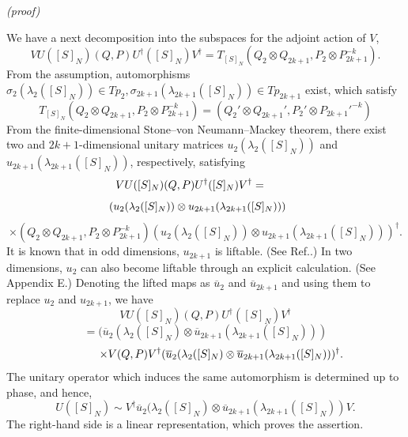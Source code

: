 \documentclass[12pt]{iopart}
\begin{document}
\noindent
{\it (proof)}

We have a next decomposition into the subspaces for the adjoint action of \(V\),
\begin{equation}
VU([S]_N)(Q,P)U^\dagger([S]_N)V^\dagger
=T_{[S]_N}(Q_2\otimes Q_{2k+1},P_2\otimes P_{2k+1}^{-k}).
\end{equation}
%
From the assumption, automorphisms
\(\sigma_2(\lambda_2([S]_N))\in Tp_2,
\sigma_{2k+1}(\lambda_{2k+1}([S]_N))\in Tp_{2k+1}\) exist,
which satisfy
\begin{equation}
T_{[S]_N}(Q_2\otimes Q_{2k+1},P_2\otimes P_{2k+1}^{-k})
=(Q_2'\otimes Q_{2k+1}',P_2'\otimes P_{2k+1}'^{-k})
\end{equation}
%
From the finite-dimensional Stone--von Neumann--Mackey theorem, there exist two and \(2k+1\)-dimensional
unitary matrices \(u_2(\lambda_2([S]_N))\) and \(u_{2k+1}(\lambda_{2k+1}([S]_N))\), respectively,  satisfying
\begin{equation}
\hspace{-10mm}
VU([S]_N)(Q,P)U^\dagger([S]_N)V^\dagger=
\end{equation}
\[
\hspace{-5mm}
(u_2(\lambda_2([S]_N))\otimes u_{2k+1}(\lambda_{2k+1}([S]_N)))
\]
\begin{equation}
\times
(Q_2\otimes Q_{2k+1},P_2\otimes P_{2k+1}^{-k})(u_2(\lambda_2([S]_N))\otimes u_{2k+1}(\lambda_{2k+1}([S]_N)))^\dagger.
\end{equation}
%
It is known that in odd dimensions, \(u_{2k+1}\) is liftable. (See Ref.\cite{Dutta-Prasad_2015}.)
In two dimensions, \(u_2\) can also become liftable through an explicit calculation.
(See Appendix E.)
Denoting the lifted maps as \(\overline u_2\) and \(\overline u_{2k+1}\) and using them to replace
\(u_2\) and \(u_{2k+1}\), we have
\begin{equation}
VU([S]_N)(Q,P)U^\dagger([S]_N)V^\dagger
\end{equation}
\[
=
(\overline u_2(\lambda_2([S]_N)\otimes\overline u_{2k+1}(\lambda_{2k+1}([S]_N)))
\]
\begin{equation}
\hspace{10mm}
\times
V(Q,P)V^\dagger
(\overline u_2(\lambda_2([S]_N)\otimes\overline u_{2k+1}(\lambda_{2k+1}([S]_N)))^\dagger.
\end{equation}
%
The unitary operator which induces the same automorphism is determined up to phase, and hence,
\begin{equation}
U([S]_N)
\sim
V^\dagger\overline u_2(\lambda_2([S]_N)\otimes\overline u_{2k+1}(\lambda_{2k+1}([S]_N))V.
\end{equation}
The right-hand side is a linear representation, which proves the assertion.
\\
\end{document}
